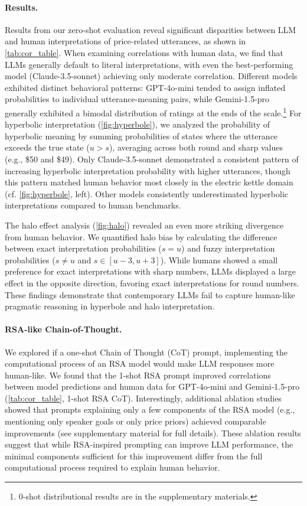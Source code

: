 \paragraph{Results.}
Results from our zero-shot evaluation reveal significant disparities between LLM and human interpretations of price-related utterances, as shown in \autoref{tab:cor_table}. 
When examining correlations with human data, we find that LLMs generally default to literal interpretations, with even the best-performing model (Claude-3.5-sonnet) achieving only moderate correlation. Different models exhibited distinct behavioral patterns: GPT-4o-mini tended to assign inflated probabilities to individual utterance-meaning pairs, while Gemini-1.5-pro generally exhibited a bimodal distribution of ratings at the ends of the scale.\footnote{0-shot distributional results are in the supplementary materials.}
For hyperbolic interpretation (\autoref{fig:hyperbole}), we analyzed the probability of hyperbolic meaning by summing probabilities of states where the utterance exceeds the true state ($u > s$), averaging across both round and sharp values (e.g., \$50 and \$49). Only Claude-3.5-sonnet demonstrated a consistent pattern of increasing hyperbolic interpretation probability with higher utterances, though this pattern matched human behavior most closely in the electric kettle domain (cf. \autoref{fig:hyperbole}, left). Other models consistently underestimated hyperbolic interpretations compared to human benchmarks.

The halo effect analysis (\autoref{fig:halo}) revealed an even more striking divergence from human behavior. We quantified halo bias by calculating the difference between exact interpretation probabilities ($s = u$) and fuzzy interpretation probabilities ($s \neq u$ and $s \in [u-3, u+3]$).
While humans showed a small preference for exact interpretations with sharp numbers, LLMs displayed a large effect in the opposite direction, favoring exact interpretations for round numbers. 
These findings demonstrate that contemporary LLMs fail to capture human-like pragmatic reasoning in hyperbole and halo interpretation.

\paragraph{RSA-like Chain-of-Thought.} We explored if a one-shot Chain of Thought (CoT) prompt, implementing the computational process of an RSA model would make LLM responses more human-like. We found that the 1-shot RSA prompt improved correlations between model predictions and human data for GPT-4o-mini and Gemini-1.5-pro (\autoref{tab:cor_table}, 1-shot RSA CoT). 
Interestingly, additional ablation studies showed that prompts explaining only a few components of the RSA model (e.g., mentioning only speaker goals or only price priors) achieved comparable  improvements (see supplementary material for full details).
These ablation results suggest that while RSA-inspired prompting can improve LLM performance, the minimal components sufficient for this improvement differ from the full computational process required to explain human behavior.


